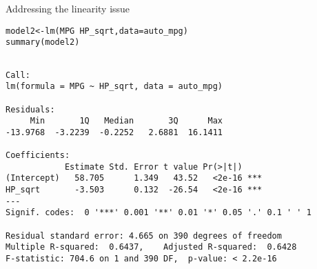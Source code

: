 \documentclass{beamer}\usepackage[]{graphicx}\usepackage[]{color}
\makeatletter
\newcommand{\hlstr}[1]{\textcolor[rgb]{1,0.894,0.71}{#1}}%
\newcommand{\hlopt}[1]{\textcolor[rgb]{1,0.894,0.769}{#1}}%
\newcommand{\hlstd}[1]{\textcolor[rgb]{1,0.894,0.769}{#1}}%
\newcommand{\hlkwb}[1]{\textcolor[rgb]{0.804,0.776,0.451}{#1}}%
\newcommand{\hlkwc}[1]{\textcolor[rgb]{0.78,0.941,0.545}{#1}}%
\newcommand{\hlkwd}[1]{\textcolor[rgb]{1,0.78,0.769}{#1}}%
\newenvironment{kframe}{%
 \def\at@end@of@kframe{}%
 \ifinner\ifhmode%
  \def\at@end@of@kframe{\end{minipage}}%
  \begin{minipage}{\columnwidth}%
 \fi\fi%
 \def\FrameCommand##1{\hskip\@totalleftmargin \hskip-\fboxsep
 \colorbox{shadecolor}{##1}\hskip-\fboxsep
     \hskip-\linewidth \hskip-\@totalleftmargin \hskip\columnwidth}%
 \MakeFramed {\advance\hsize-\width
   \@totalleftmargin\z@ \linewidth\hsize
   \@setminipage}}%
 {\par\unskip\endMakeFramed%
 \at@end@of@kframe}
\newenvironment{knitrout}{}{} %
\makeatother
\begin{document}
\begin{darkframes}
  
  
  
    \begin{frame}[fragile]{Addressing the linearity issue}
      \fontsize{9}{9}\selectfont
\begin{knitrout}
\begin{kframe}
\begin{alltt}
  \hlstd{model2}\hlkwb{<-}\hlkwd{lm}\hlstd{(MPG} \hlopt{~} \hlstd{HP_sqrt,} \hlkwc{data}\hlstd{=auto_mpg)}
  \hlkwd{summary}\hlstd{(model2)}
\end{alltt}
\begin{verbatim}

Call:
lm(formula = MPG ~ HP_sqrt, data = auto_mpg)

Residuals:
     Min       1Q   Median       3Q      Max 
-13.9768  -3.2239  -0.2252   2.6881  16.1411 

Coefficients:
            Estimate Std. Error t value Pr(>|t|)    
(Intercept)   58.705      1.349   43.52   <2e-16 ***
HP_sqrt       -3.503      0.132  -26.54   <2e-16 ***
---
Signif. codes:  0 '***' 0.001 '**' 0.01 '*' 0.05 '.' 0.1 ' ' 1

Residual standard error: 4.665 on 390 degrees of freedom
Multiple R-squared:  0.6437,	Adjusted R-squared:  0.6428 
F-statistic: 704.6 on 1 and 390 DF,  p-value: < 2.2e-16
\end{verbatim}
\end{kframe}
\end{knitrout}
    \end{frame}
    
    
\end{darkframes}
\end{document}
